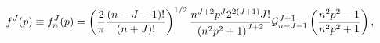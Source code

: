 \begin{equation}
f^{J}(p)\equiv f_{n}^{J}(p)=\left( \frac{2}{\pi }\frac{\left( n-J-1\right) !%
}{\left( n+J\right) !}\right) ^{1/2}\frac{n^{J+2}p^{J}2^{2\left( J+1\right)
}J!}{\left( n^{2}p^{2}+1\right) ^{J+2}}\mathcal{G}_{n-J-1}^{J+1}\left( \frac{%
n^{2}p^{2}-1}{n^{2}p^{2}+1}\right) ,
\end{equation}

